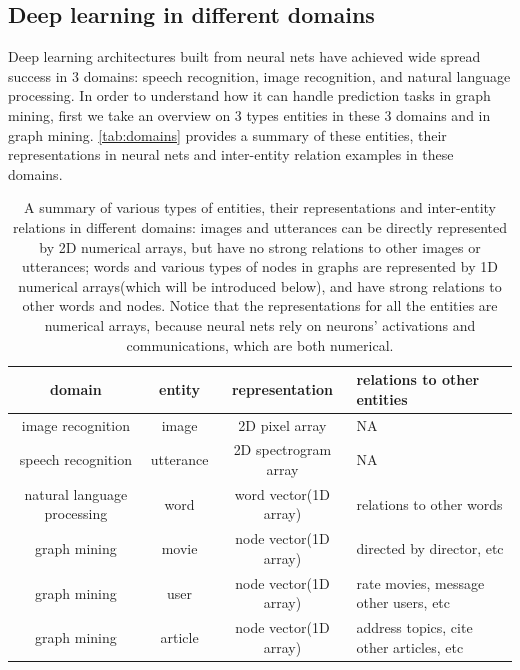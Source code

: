\documentclass{article}
\begin{document}
\subsection{Deep learning in different domains}
Deep learning architectures built from neural nets have achieved wide spread success in 3 domains: speech recognition\cite{hannun2014deep}, image recognition\cite{simonyan2014very}, and natural language processing\cite{yao2013recurrent}. In order to understand how it can handle prediction tasks in graph mining, first we take an overview on 3 types entities in these 3 domains and in graph mining. \autoref{tab:domains} provides a summary of these entities, their representations in neural nets and inter-entity relation examples in these domains.
\begin{table}[h]
	\centering
	\begin{tabularx}{\textwidth}{ |c|c|c|X| }
		\hline domain & entity & representation & relations to other entities \\ 
		\hline image recognition & image & 2D pixel array & NA \\ 
		\hline speech recognition & utterance & 2D spectrogram array & NA \\ 
		\hline natural language processing & word & word vector(1D array) & relations to other words \\ 
		\hline graph mining & movie & node vector(1D array) & directed by director, etc \\ 
		\hline graph mining & user & node vector(1D array) & rate movies, message other users, etc \\ 
		\hline graph mining & article & node vector(1D array) & address topics, cite other articles, etc \\
		\hline
	\end{tabularx}
	\caption{A summary of various types of entities, their representations and inter-entity relations in different domains: images and utterances can be directly represented by 2D numerical arrays, but have no strong relations to other images or utterances; words and various types of nodes in graphs are  represented by 1D numerical arrays(which will be introduced below), and have strong relations to other words and nodes. Notice that the representations for all the entities are numerical arrays, because neural nets rely on neurons' activations and communications, which are both numerical.}
	\label{tab:domains}
\end{table}
\end{document}
